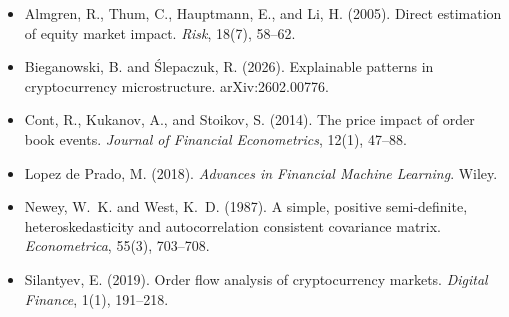 \documentclass[11pt,a4paper]{article}
\begin{document}
\begin{itemize}
    \setlength{\itemsep}{0.2em}
    \item Almgren, R., Thum, C., Hauptmann, E., and Li, H. (2005). Direct estimation of equity market impact. \textit{Risk}, 18(7), 58--62.
    \item Bieganowski, B. and Ślepaczuk, R. (2026). Explainable patterns in cryptocurrency microstructure. arXiv:2602.00776.
    \item Cont, R., Kukanov, A., and Stoikov, S. (2014). The price impact of order book events. \textit{Journal of Financial Econometrics}, 12(1), 47--88.
    \item Lopez de Prado, M. (2018). \textit{Advances in Financial Machine Learning}. Wiley.
    \item Newey, W.~K. and West, K.~D. (1987). A simple, positive semi-definite, heteroskedasticity and autocorrelation consistent covariance matrix. \textit{Econometrica}, 55(3), 703--708.
    \item Silantyev, E. (2019). Order flow analysis of cryptocurrency markets. \textit{Digital Finance}, 1(1), 191--218.
\end{itemize}
\end{document}
